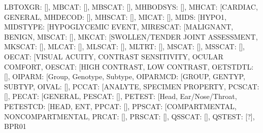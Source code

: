 \documentclass[letterpaper,10pt,english]{sphinxmanual}
\begin{document}
\begin{fulllineitems}
\begin{fulllineitems}
\textquotesingle{}LBTOXGR\textquotesingle{}: {[}{]}, \textquotesingle{}MBCAT\textquotesingle{}: {[}{]}, \textquotesingle{}MBSCAT\textquotesingle{}: {[}{]}, \textquotesingle{}MHBODSYS\textquotesingle{}: {[}{]}, \textquotesingle{}MHCAT\textquotesingle{}: {[}\textquotesingle{}CARDIAC\textquotesingle{}, \textquotesingle{}GENERAL\textquotesingle{}{]}, \textquotesingle{}MHDECOD\textquotesingle{}: {[}{]}, \textquotesingle{}MHSCAT\textquotesingle{}: {[}{]}, \textquotesingle{}MICAT\textquotesingle{}: {[}{]}, \textquotesingle{}MIDS\textquotesingle{}: {[}\textquotesingle{}HYPO1\textquotesingle{}{]}, \textquotesingle{}MIDSTYPE\textquotesingle{}: {[}\textquotesingle{}HYPOGLYCEMIC EVENT\textquotesingle{}{]}, \textquotesingle{}MIRESCAT\textquotesingle{}: {[}\textquotesingle{}MALIGNANT\textquotesingle{}, \textquotesingle{}BENIGN\textquotesingle{}{]}, \textquotesingle{}MISCAT\textquotesingle{}: {[}{]}, \textquotesingle{}MKCAT\textquotesingle{}: {[}\textquotesingle{}SWOLLEN/TENDER JOINT ASSESSMENT\textquotesingle{}{]}, \textquotesingle{}MKSCAT\textquotesingle{}: {[}{]}, \textquotesingle{}MLCAT\textquotesingle{}: {[}{]}, \textquotesingle{}MLSCAT\textquotesingle{}: {[}{]}, \textquotesingle{}MLTRT\textquotesingle{}: {[}{]}, \textquotesingle{}MSCAT\textquotesingle{}: {[}{]}, \textquotesingle{}MSSCAT\textquotesingle{}: {[}{]}, \textquotesingle{}OECAT\textquotesingle{}: {[}\textquotesingle{}VISUAL ACUITY\textquotesingle{}, \textquotesingle{}CONTRAST SENSITIVITY\textquotesingle{}, \textquotesingle{}OCULAR COMFORT\textquotesingle{}{]}, \textquotesingle{}OESCAT\textquotesingle{}: {[}\textquotesingle{}HIGH CONTRAST\textquotesingle{}, \textquotesingle{}LOW CONTRAST\textquotesingle{}{]}, \textquotesingle{}OETSTDTL\textquotesingle{}: {[}{]}, \textquotesingle{}OIPARM\textquotesingle{}: {[}\textquotesingle{}Group\textquotesingle{}, \textquotesingle{}Genotype\textquotesingle{}, \textquotesingle{}Subtype\textquotesingle{}{]}, \textquotesingle{}OIPARMCD\textquotesingle{}: {[}\textquotesingle{}GROUP\textquotesingle{}, \textquotesingle{}GENTYP\textquotesingle{}, \textquotesingle{}SUBTYP\textquotesingle{}{]}, \textquotesingle{}OIVAL\textquotesingle{}: {[}{]}, \textquotesingle{}PCCAT\textquotesingle{}: {[}\textquotesingle{}ANALYTE\textquotesingle{}, \textquotesingle{}SPECIMEN PROPERTY\textquotesingle{}{]}, \textquotesingle{}PCSCAT\textquotesingle{}: {[}{]}, \textquotesingle{}PECAT\textquotesingle{}: {[}\textquotesingle{}GENERAL\textquotesingle{}{]}, \textquotesingle{}PESCAT\textquotesingle{}: {[}{]}, \textquotesingle{}PETEST\textquotesingle{}: {[}\textquotesingle{}Head\textquotesingle{}, \textquotesingle{}Ear/Nose/Throat\textquotesingle{}{]}, \textquotesingle{}PETESTCD\textquotesingle{}: {[}\textquotesingle{}HEAD\textquotesingle{}, \textquotesingle{}ENT\textquotesingle{}{]}, \textquotesingle{}PPCAT\textquotesingle{}: {[}{]}, \textquotesingle{}PPSCAT\textquotesingle{}: {[}\textquotesingle{}COMPARTMENTAL\textquotesingle{}, \textquotesingle{}NON\sphinxhyphen{}COMPARTMENTAL\textquotesingle{}{]}, \textquotesingle{}PRCAT\textquotesingle{}: {[}{]}, \textquotesingle{}PRSCAT\textquotesingle{}: {[}{]}, \textquotesingle{}QSSCAT\textquotesingle{}: {[}{]}, \textquotesingle{}QSTEST\textquotesingle{}: {[}\textquotesingle{}{[}?{]}\textquotesingle{}, \textquotesingle{}BPR01 
\end{fulllineitems}
\end{fulllineitems}
\end{document}
